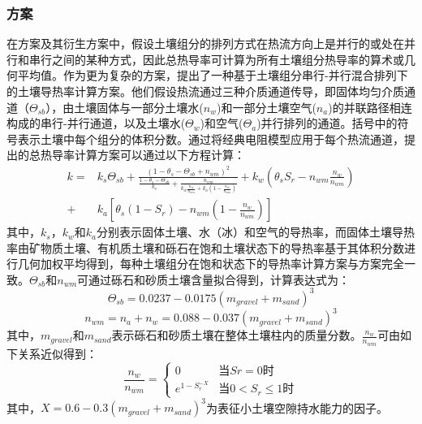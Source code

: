 \subsubsection{\citet{tarnawski2012series}方案}
在\citet{Johansen1975}方案及其衍生方案中，假设土壤组分的排列方式在热流方向上是并行的或处在并行和串行之间的某种方式，因此总热导率可计算为所有土壤组分热导率的算术或几何平均值。作为更为复杂的方案，\citet{tarnawski2012series}提出了一种基于土壤组分串行-并行混合排列下的土壤导热率计算方案。他们假设热流通过三种介质通道传导，即固体均匀介质通道（$\Theta_{sb}$），由土壤固体与一部分土壤水($n_w$)和一部分土壤空气($n_a$)的并联路径相连构成的串行-并行通道，以及土壤水($\Theta_w$)和空气($\Theta_a$)并行排列的通道。括号中的符号表示土壤中每个组分的体积分数。通过将经典电阻模型应用于每个热流通道，\citet{tarnawski2012series}提出的总热导率计算方案可以通过以下方程计算：
\begin{equation}
\begin{aligned}
k=&k_s\Theta_{sb}+\frac{(1-\theta_s-\Theta_{sb}+n_{wm})^2}{\frac{1-\theta_s-\Theta_{sb}}{k_s}+\frac{n_{wm}}{k_w\frac{n_w}{n_{wm}}+k_a\left(1-\frac{n_w}{n_{wm}}\right)}}+k_w\left(\theta_sS_r-n_{wm}\frac{n_w}{n_{wm}}\right) \\
+&k_a\left[\theta_s(1-S_r)-n_{wm}\left(1-\frac{n_w}{n_{wm}}\right)\right]
\end{aligned}
\end{equation}
其中，$k_s$，$k_w$和$k_a$分别表示固体土壤、水（冰）和空气的导热率，而固体土壤导热率由矿物质土壤、有机质土壤和砾石在饱和土壤状态下的导热率基于其体积分数进行几何加权平均得到，每种土壤组分在饱和状态下的导热率计算方案与\citet{Johansen1975}方案完全一致。$\Theta_{sb}$和$n_{wm}$可通过砾石和砂质土壤含量拟合得到，计算表达式为：$$\Theta_{sb}=0.0237-0.0175\left(m_{gravel}+m_{sand}\right)^3$$$$n_{wm}=n_a+n_w=0.088-0.037\left(m_{gravel}+m_{sand}\right)^3$$
其中，$m_{gravel}$和$m_{sand}$表示砾石和砂质土壤在整体土壤柱内的质量分数。$\frac{n_w}{n_{wm}}$可由如下关系近似得到：
\begin{equation}
\frac{n_w}{n_{wm}}=\begin{cases}
0  & \text{当} Sr=0 \text{时} \\ 
e^{1-S_r^{-X}} & \text{当}0<S_r\leq1\text{时}
\end{cases}
\end{equation}
其中，$X=0.6-0.3\left(m_{gravel}+m_{sand}\right)^3$为表征小土壤空隙持水能力的因子。

